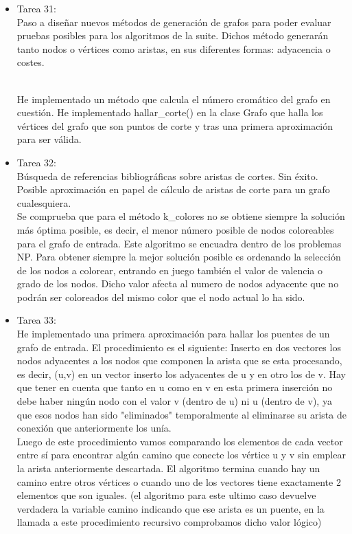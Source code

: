 \begin{itemize}
\item Tarea 31:\\
Paso a diseñar nuevos métodos de generación de grafos para poder evaluar pruebas posibles para los algoritmos de la suite. Dichos método generarán tanto nodos o vértices como aristas, en sus diferentes formas: adyacencia o costes.\\\

He implementado un método que calcula el número cromático del grafo en cuestión.
He implementado hallar\_corte() en la clase Grafo que halla los vértices del grafo que son puntos de corte y tras una primera aproximación para ser válida.\\

\item Tarea 32:\\
Búsqueda de referencias bibliográficas sobre aristas de cortes. Sin éxito. Posible aproximación en papel de cálculo de aristas de corte para un grafo cualesquiera.\\

Se comprueba que para el método k\_colores no se obtiene siempre la solución más óptima posible, es decir, el menor número posible de nodos coloreables para el grafo de entrada. Este algoritmo se encuadra dentro de los problemas NP. Para obtener siempre la mejor solución posible es ordenando la selección de los nodos a colorear, entrando en juego también el valor de valencia o grado de los nodos. Dicho valor afecta al numero de nodos adyacente que no podrán ser coloreados del mismo color que el nodo actual lo ha sido.\\

\item Tarea 33:\\
He implementado una primera aproximación para hallar los puentes de un grafo de entrada. El procedimiento es el siguiente: Inserto en dos vectores los nodos adyacentes a los nodos que componen la arista que se esta procesando, es decir, (u,v) en un vector inserto los adyacentes de u y en otro los de v. Hay que tener en cuenta que tanto en u como en v en esta primera inserción no debe haber ningún nodo con el valor v (dentro de u) ni u (dentro de v), ya que esos nodos han sido "eliminados" temporalmente al eliminarse su arista de conexión que anteriormente los unía.\\

Luego de este procedimiento vamos comparando los elementos de cada vector entre sí para encontrar algún camino que conecte los vértice u y v sin emplear la arista anteriormente descartada. El algoritmo termina cuando hay un camino entre otros vértices o cuando uno de los vectores tiene exactamente 2 elementos que son iguales. (el algoritmo para este ultimo caso devuelve verdadera la variable camino indicando que ese arista es un puente, en la llamada a este procedimiento recursivo comprobamos dicho valor lógico)\\


\end{itemize}
